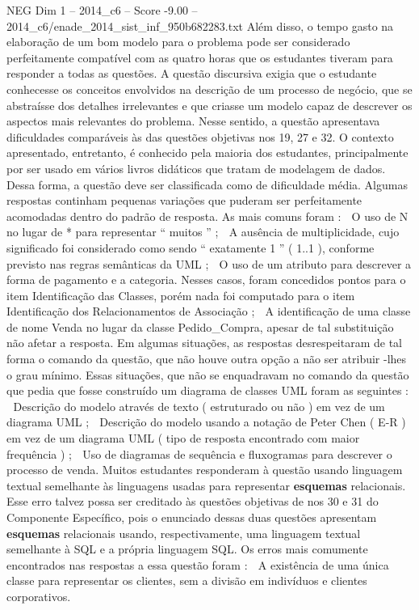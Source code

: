 \begin{textsample}{NEG Dim 1 – 2014\_c6 – Score -9.00 – 2014\_c6/enade\_2014\_sist\_inf\_950b682283.txt}
Além disso, o tempo gasto na elaboração de um bom modelo para o problema pode ser considerado perfeitamente compatível com as quatro horas que os estudantes tiveram para responder a todas as questões.
A questão discursiva exigia que o estudante conhecesse os conceitos envolvidos na descrição de um processo de negócio, que se abstraísse dos detalhes irrelevantes e que criasse um modelo capaz de descrever os aspectos mais relevantes do problema.
Nesse sentido, a questão apresentava dificuldades comparáveis às das questões objetivas nos 19, 27 e 32.
O contexto apresentado, entretanto, é conhecido pela maioria dos estudantes, principalmente por ser usado em vários livros didáticos que tratam de modelagem de dados.
Dessa forma, a questão deve ser classificada como de dificuldade média.
Algumas respostas continham pequenas variações que puderam ser perfeitamente acomodadas dentro do padrão de resposta.
As mais comuns foram :  O uso de N no lugar de * para representar “ muitos ” ;  A ausência de multiplicidade, cujo significado foi considerado como sendo “ exatamente 1 ” ( 1..1 ), conforme previsto nas regras semânticas da UML ;  O uso de um atributo para descrever a forma de pagamento e a categoria.
Nesses casos, foram concedidos pontos para o item Identificação das Classes, porém nada foi computado para o item Identificação dos Relacionamentos de Associação ;  A identificação de uma classe de nome Venda no lugar da classe Pedido\_Compra, apesar de tal substituição não afetar a resposta.
Em algumas situações, as respostas desrespeitaram de tal forma o comando da questão, que não houve outra opção a não ser atribuir -lhes o grau mínimo.
Essas situações, que não se enquadravam no comando da questão que pedia que fosse construído um diagrama de classes UML foram as seguintes :  Descrição do modelo através de texto ( estruturado ou não ) em vez de um diagrama UML ;  Descrição do modelo usando a notação de Peter Chen ( E-R ) em vez de um diagrama UML ( tipo de resposta encontrado com maior frequência ) ;  Uso de diagramas de sequência e fluxogramas para descrever o processo de venda.
Muitos estudantes responderam à questão usando linguagem textual semelhante às linguagens usadas para representar \textbf{esquemas} relacionais.
Esse erro talvez possa ser creditado às questões objetivas de nos 30 e 31 do Componente Específico, pois o enunciado dessas duas questões apresentam \textbf{esquemas} relacionais usando, respectivamente, uma linguagem textual semelhante à SQL e a própria linguagem SQL.
Os erros mais comumente encontrados nas respostas a essa questão foram :  A existência de uma única classe para representar os clientes, sem a divisão em indivíduos e clientes corporativos.

\end{textsample}
